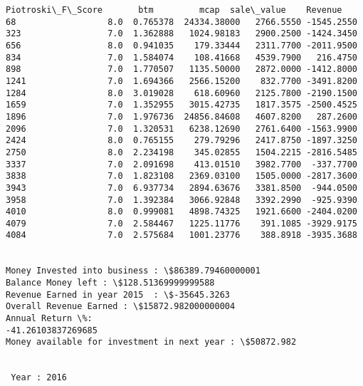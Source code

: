 \documentclass[11pt]{article}
\begin{document}
\begin{Verbatim}[commandchars=\\\{\}]
      Piotroski\_F\_Score       btm         mcap  sale\_value    Revenue
68                  8.0  0.765378  24334.38000   2766.5550 -1545.2550
323                 7.0  1.362888   1024.98183   2900.2500 -1424.3450
656                 8.0  0.941035    179.33444   2311.7700 -2011.9500
834                 7.0  1.584074    108.41668   4539.7900   216.4750
898                 7.0  1.770507   1135.50000   2872.0000 -1412.8000
1241                7.0  1.694366   2566.15200    832.7700 -3491.8200
1284                8.0  3.019028    618.60960   2125.7800 -2190.1500
1659                7.0  1.352955   3015.42735   1817.3575 -2500.4525
1896                7.0  1.976736  24856.84608   4607.8200   287.2600
2096                7.0  1.320531   6238.12690   2761.6400 -1563.9900
2424                8.0  0.765155    279.79296   2417.8750 -1897.3250
2750                8.0  2.234198    345.02855   1504.2215 -2816.5485
3337                7.0  2.091698    413.01510   3982.7700  -337.7700
3838                7.0  1.823108   2369.03100   1505.0000 -2817.3600
3943                7.0  6.937734   2894.63676   3381.8500  -944.0500
3958                7.0  1.392384   3066.92848   3392.2990  -925.9390
4010                8.0  0.999081   4898.74325   1921.6600 -2404.0200
4079                7.0  2.584467   1225.11776    391.1085 -3929.9175
4084                7.0  2.575684   1001.23776    388.8918 -3935.3688


Money Invested into business : \$86389.79460000001
Balance Money left : \$128.51369999999588
Revenue Earned in year 2015  : \$-35645.3263
Overall Revenue Earned : \$15872.982000000004
Annual Return \%:
-41.26103837269685
Money available for investment in next year : \$50872.982


 Year : 2016


\end{Verbatim}
\end{document}
